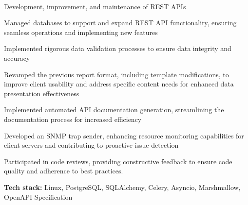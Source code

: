 \documentclass[a4paper]{MagicalCV}
\begin{document}
\hfill
\begin{minipage}[t]{0.64\textwidth} 


 \\
\vspace{\topsep} %
\begin{tightemize}
  \item Development, improvement, and maintenance of REST APIs
  \item Managed databases to support and expand REST API functionality, ensuring seamless operations and implementing new features
  \item Implemented rigorous data validation processes to ensure data integrity and accuracy
  \item Revamped the previous report format, including template modifications, to improve client usability and address specific content needs for enhanced data presentation effectiveness
  \item Implemented automated API documentation generation, streamlining the documentation process for increased efficiency
  \item Developed an SNMP trap sender, enhancing resource monitoring capabilities for client servers and contributing to proactive issue detection
  \item Participated in code reviews, providing constructive feedback to ensure code quality and adherence to best practices.
\end{tightemize}
\textbf{Tech stack:} Linux, PostgreSQL, SQLAlchemy, Celery, Asyncio, Marshmallow, OpenAPI Specification
\sectionsep

 \\
\vspace{\topsep} %


\end{minipage}
\end{document}
